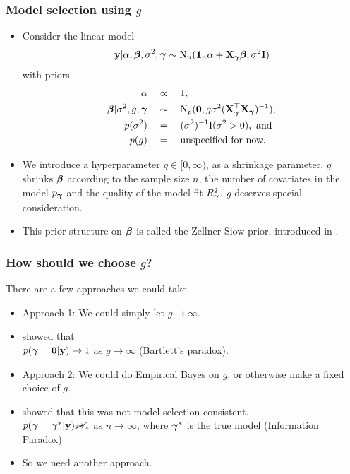 \documentclass{beamer}
\begin{document}
\begin{frame}
	\frametitle{Model selection using $g$}
	\begin{itemize}
		\item Consider the linear model
		\begin{align*}
			{\bf y} | \alpha, {\boldsymbol \beta}, \sigma^2, {\boldsymbol \gamma} \sim \text{N}_n({\bf 1}_n \alpha + {\bf X}_{\boldsymbol \gamma} {\boldsymbol \beta}, \sigma^2 {\bf I}) 
		\end{align*}
		with priors
		\begin{align*}
			\alpha \quad & \propto \quad 1, \\
			{\boldsymbol \beta} | \sigma^2, g, {\boldsymbol \gamma} \quad & \sim \quad \text{N}_p({\bf 0}, g \sigma^2 ({\bf X}_{\boldsymbol \gamma}^\top {\bf X}_{\boldsymbol \gamma})^{-1}),                     \\
			p(\sigma^2)          \quad & = \quad (\sigma^2)^{-1} \text{I}(\sigma^2 > 0), \text{ and }                    \\
			p(g)                 \quad & = \quad \text{unspecified for now}.
		\end{align*}
		\item We introduce a hyperparameter $g \in [0, \infty)$, as a shrinkage parameter.
					$g$ shrinks ${\boldsymbol \beta}$ according to the sample size $n$, the number of covariates in the model $p_{\boldsymbol \gamma}$
					and the quality of the model fit $R^2_{\boldsymbol \gamma}$.
					$g$ deserves special consideration.
		\item This prior structure on ${\boldsymbol \beta}$ is called the Zellner-Siow prior, introduced in \cite{Zellner1980}.
	\end{itemize}
\end{frame}

\begin{frame}
	\frametitle{How should we choose $g$?}
	There are a few approaches we could take.
	\begin{itemize}
		\item Approach 1: We could simply let $g \to \infty$.
		\item \cite{Liang2008} showed that\\
		$p({\boldsymbol \gamma} = {\bf 0} | {\bf y}) \to 1$ as $g \to \infty$ (Bartlett's paradox).
		\item Approach 2: We could do Empirical Bayes on $g$, or otherwise make a fixed choice of $g$.
		\item \cite{Liang2008} showed that this was not model selection consistent. \\
					$p({\boldsymbol \gamma} = {\boldsymbol \gamma}^* | {\bf y}) \cancel{\to} 1$ as $n \to \infty$,
					where ${\boldsymbol \gamma}^*$ is the true model (Information Paradox)
		\item So we need another approach.
	\end{itemize}

\end{frame}
\end{document}
